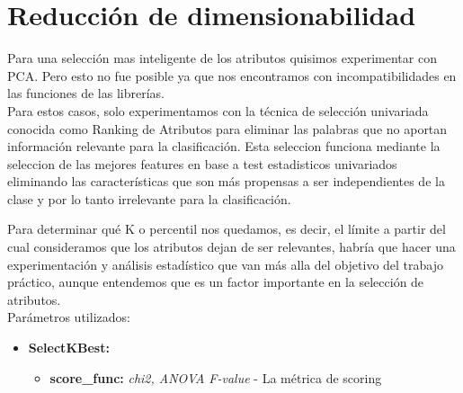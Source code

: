\section{Reducción de dimensionabilidad}


Para una selección mas inteligente de los atributos quisimos experimentar con PCA. Pero esto no fue posible ya que nos encontramos con incompatibilidades en las funciones de las librerías. \\

Para estos casos, solo experimentamos con la técnica de selección univariada conocida como Ranking de Atributos para eliminar las palabras que no aportan información relevante para la clasificación. Esta seleccion funciona mediante la seleccion de las mejores features en base a test estadisticos univariados eliminando las características que son más propensas a ser independientes de la clase y por lo tanto irrelevante para la clasificación.

Para determinar qué K o percentil nos quedamos, es decir, el límite a partir del cual consideramos que los atributos dejan de ser relevantes, habría que hacer una experimentación y análisis estadístico que van más alla del objetivo del trabajo práctico, aunque entendemos que es un factor importante en la selección de atributos. \\

Parámetros utilizados:

\begin{itemize}
\item \textbf{SelectKBest:} 
	\begin{itemize}
	\item \textbf{score\_func:} \textit{chi2, ANOVA F-value} - La métrica de scoring
	\end{itemize}
\end{itemize}



